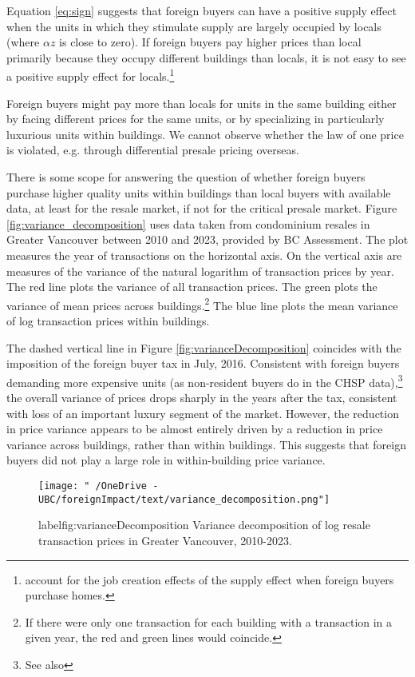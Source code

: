 \documentclass[12pt]{article}
\begin{document}
Equation \eqref{eq:sign} suggests that foreign buyers can have a positive
supply effect when the units in which they stimulate supply are largely
occupied by locals (where $\alpha z$ is close to zero). If foreign buyers pay
higher prices than local primarily because they occupy different buildings than
locals, it is not easy to see a positive supply effect for
locals.\footnote{\textcite{FavilukisVanNieuwerburgh} account for the job
creation effects of the supply effect when foreign buyers purchase homes.}

Foreign buyers might pay more than locals for units in the same building either
by facing different prices for the same units, or by specializing in
particularly luxurious units within buildings. We cannot observe whether the
law of one price is violated, e.g.  through differential presale pricing
overseas.

There is some scope for answering the question of whether foreign buyers
purchase higher quality units within buildings than local buyers with available
data, at least for the resale market, if not for the critical presale market.
Figure \ref{fig:variance_decomposition} uses data taken from condominium
resales in Greater Vancouver between 2010 and 2023, provided by BC Assessment.
The plot measures the year of transactions on the horizontal axis. On the
vertical axis are measures of the variance of the natural logarithm of
transaction prices by year. The red line plots the variance of all transaction
prices. The green plots the variance of mean prices across
buildings.\footnote{If there were only one transaction for each building with a
transaction in a given year, the red and green lines would coincide.} The blue
line plots the mean variance of log transaction prices within buildings. 

The dashed vertical line in Figure \ref{fig:varianceDecomposition} coincides
with the imposition of the foreign buyer tax in July, 2016. Consistent with
foreign buyers demanding more expensive units (as non-resident buyers do in the
CHSP data),\footnote{See also}  the overall variance of prices drops sharply in
the years after the tax, consistent with loss of an important luxury segment of
the market.  However, the reduction in price variance appears to be almost
entirely driven by a reduction in price variance across buildings, rather than
within buildings. This suggests that foreign buyers did not play a large role
in within-building price variance.

\begin{figure}
	\caption{label{fig:varianceDecomposition} Variance decomposition of log resale transaction prices in Greater Vancouver, 2010-2023.}
\texttt{[image: "~/OneDrive - UBC/foreignImpact/text/variance\_decomposition.png"]}
\end{figure}
\end{document}
